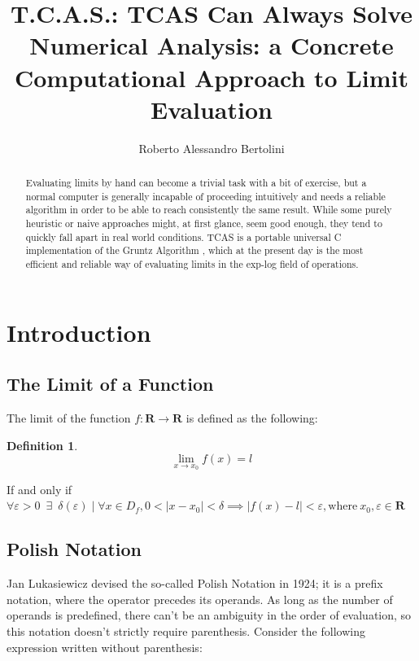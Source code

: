 \documentclass{article}
\title{\textbf{T.C.A.S.}: \textbf{T}CAS \textbf{C}an \textbf{A}lways \textbf{S}olve \\
	\large Numerical Analysis: a Concrete Computational Approach to Limit Evaluation}
\author{Roberto Alessandro Bertolini}
\date{}
\affil{Liceo Nervi Ferrari - Morbegno}
\theoremstyle{plain}
\theoremstyle{definition}
\newtheorem{defn}[thm]{Definition}
\begin{document}
	\maketitle
	
	\begin{abstract}
		Evaluating limits by hand can become a trivial task with a bit of exercise, but a normal computer is generally incapable of proceeding intuitively and needs a reliable algorithm in order to be able to reach consistently the same result. 
		While some purely heuristic or naive approaches might, at first glance, seem good enough, they tend to quickly fall apart in real world conditions. TCAS is a portable universal C implementation of the Gruntz Algorithm \cite{gruntz}, which at the present day is the most efficient and reliable way of evaluating limits in the exp-log field of operations.
	\end{abstract}
	
	\tableofcontents
	
	\newpage	
	
	\section{Introduction}
	
	\subsection{The Limit of a Function}
	
	The limit of the function $ f: \mathbf{R} \rightarrow \mathbf{R} $ is defined as the following:
	
	\begin{defn}
		\[ 
		\lim_{x \to x_{0}}{f(x) = l} 
		\]
		
		If and only if \( 
		\forall \varepsilon > 0 \enspace \exists \enspace \delta(\varepsilon) \mid \forall x \in D_{f}, 0 < \mid x - x_{0} \mid < \delta \implies \mid f(x) - l \mid < \varepsilon, \text{where} \: x_{0}, \varepsilon \in \mathbf{R}
		\)
	\end{defn}
	
	\subsection{Polish Notation} \label{sec:pn}
	
	Jan Lukasiewicz devised the so-called Polish Notation \cite{wiki:polish} in 1924; it is a prefix notation, where the operator precedes its operands.
	As long as the number of operands is predefined, there can't be an ambiguity in the order of evaluation, so this notation doesn't strictly require parenthesis.
	Consider the following expression written without parenthesis:
	
\end{document}
